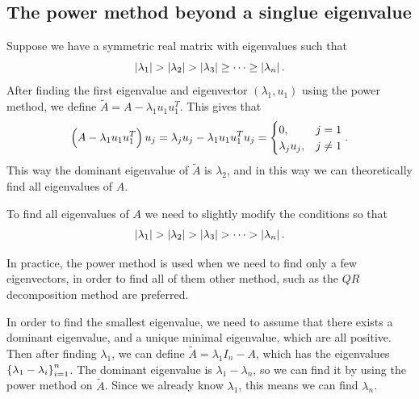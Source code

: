 \documentclass[11pt,a4paper]{article}
\begin{document}
\subsection{The power method beyond a singlue eigenvalue}
Suppose we have a symmetric real matrix with eigenvalues such that
\[
  \left\lvert\lambda_1\right\rvert > \left\lvert\lambda_2\right\rvert > \left\lvert\lambda_3\right\rvert
  \geq \cdots \geq \left\lvert\lambda_n\right\rvert.
\]
After finding the first eigenvalue and eigenvector $(\lambda_1,u_1)$
using the power method, we define $\tilde A = A - \lambda_1 u_1 u_1^T$.
This gives that
\[
  \del{A - \lambda_1 u_1 u_1^T} u_j =
  \lambda_j u_j - \lambda_1 u_1 u_1^T u_j =
  \begin{cases}
    0, &j = 1 \\
    \lambda_j u_j, &j \neq 1
  \end{cases}.
\]
This way the dominant eigenvalue of $\tilde A$ is $\lambda_2$,
and in this way we can theoretically find all eigenvalues of $A$.
\begin{remark}
  To find all eigenvalues of $A$ we need to slightly modify the conditions
  so that
  \[
    \left\lvert\lambda_1\right\rvert > \left\lvert\lambda_2\right\rvert > \left\lvert\lambda_3\right\rvert
    > \cdots > \left\lvert\lambda_n\right\rvert.
  \]
\end{remark}
\begin{remark}
  In practice, the power method is used when we need to find only a few
  eigenvectors, in order to find all of them other method, such as
  the $QR$ decomposition method are preferred.
\end{remark}

\begin{remark}
  In order to find the smallest eigenvalue,
  we need to assume that there exists a dominant eigenvalue,
  and a unique minimal eigenvalue, which are all positive.
  Then after finding $\lambda_1$,
  we can define $\tilde A = \lambda_1 I_n - A$,
  which has the eigenvalues $\left\{\lambda_1 - \lambda_i\right\}_{i=1}^{n}$.
  The dominant eigenvalue is $\lambda_1 - \lambda_n$, so we can find
  it by using the power method on $\tilde A$.
  Since we already know $\lambda_1$,
  this means we can find $\lambda_n$.
\end{remark}
\end{document}
